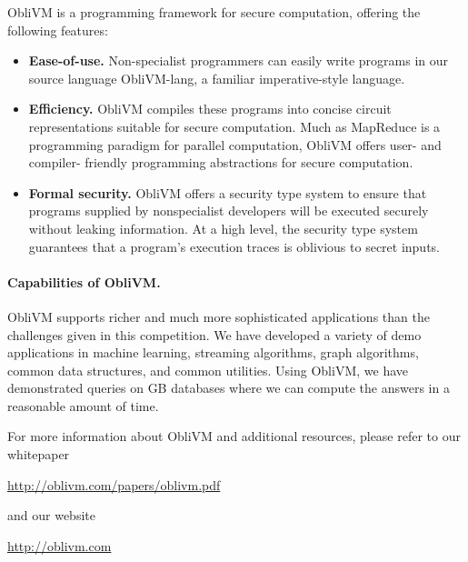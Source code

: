 \documentclass[11pt]{article}
\begin{document}
{\sf ObliVM} is a programming framework for secure computation, offering the 
following features:
\begin{itemize}
\item
{\bf Ease-of-use.} Non-specialist programmers can easily 
write programs in our source language {\sf ObliVM-lang}, a 
familiar imperative-style language.
\item
{\bf Efficiency.} {\sf ObliVM} compiles these programs into 
concise circuit representations suitable for secure computation. 
Much as MapReduce is a programming paradigm for 
parallel computation, {\sf ObliVM} offers user- and compiler- friendly
programming abstractions for secure computation.
\item
{\bf Formal security.}
{\sf ObliVM} offers a security type system to ensure 
that programs supplied by nonspecialist developers
will be executed securely without leaking information.
At a high level, the security type system guarantees
that a program's execution traces 
is oblivious to secret inputs.
\end{itemize}

\paragraph{Capabilities of {\sf ObliVM}.} 
{\sf ObliVM} supports richer and much more sophisticated applications
than the challenges given in this competition.
We have developed a variety of demo applications in machine learning,
streaming algorithms, graph algorithms, 
common data structures, and common utilities.
Using {\sf ObliVM}, we have demonstrated queries on {\sf GB} 
databases where we can compute the answers in a reasonable amount of time. 


\vspace{10pt}
For more information about {\sf ObliVM} and additional resources,
please refer to our whitepaper  

\begin{center}
\url{http://oblivm.com/papers/oblivm.pdf}
\end{center}

and our website 

\begin{center}
\url{http://oblivm.com}
\end{center}
\end{document}
